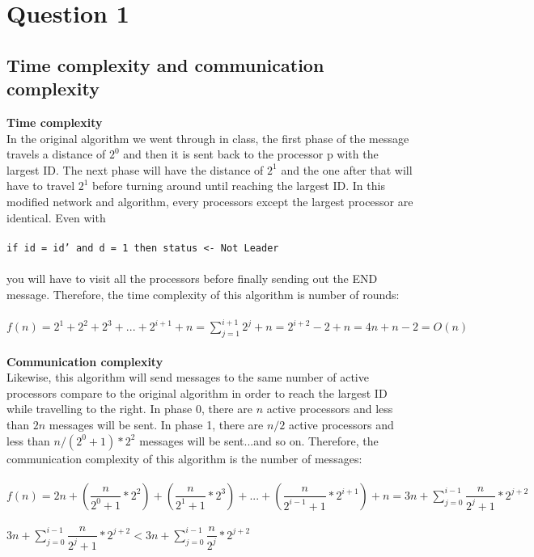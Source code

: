 \documentclass[12pt,letterpaper]{article}
\begin{document}
\newpage
\section*{Question 1}
\subsection* {Time complexity and communication complexity}
\textbf{Time complexity} \\
In the original algorithm we went through in class, the first phase of the message travels a distance of $2^0$ and then it is sent back to the processor p with the largest ID. The next phase will have the distance of $2^1$ and the one after that will have to travel $2^1$ before turning around until reaching the largest ID. In this modified network and algorithm, every processors except the largest processor are identical. Even with\\ \\
\texttt {if id = id' and d = 1 then status <- Not Leader}\\ \\
you will have to visit all the processors before finally sending out the END message. Therefore, the time complexity of this algorithm is number of rounds:\\ \\
$f(n) = 2^1 + 2^2 + 2^3 + ... + 2^{i+1} + n = \sum_{j = 1}^{i + 1} 2^j + n = 2^{i+2} - 2 + n = 4n + n - 2 = O(n)$ \\ \\

\textbf{Communication complexity} \\
Likewise, this algorithm will send messages to the same number of active processors compare to the original algorithm in order to reach the largest ID while travelling to the right. In phase 0, there are $n$ active processors and less than $2n$ messages will be sent. In phase 1, there are $n/2$ active processors and less than $n/(2^{0}+1)*2^2$ messages will be sent...and so on. Therefore, the communication complexity of this algorithm is the number of messages: \\ \\
$f(n) = 2n + (\dfrac{n}{2^{0}+1}*2^2) + (\dfrac{n}{2^{1}+1}*2^3) + ... + (\dfrac{n}{2^{i-1}+1}*2^{i+1}) + n = 3n + \sum_{j = 0}^{i - 1} \dfrac{n}{2^{j}+1}*2^{j+2} $ \\ \\

$3n + \sum_{j = 0}^{i - 1} \dfrac{n}{2^{j}+1}*2^{j+2} < 3n + \sum_{j = 0}^{i - 1} \dfrac{n}{2^{j}}*2^{j+2}$ \\ \\
\end{document}
